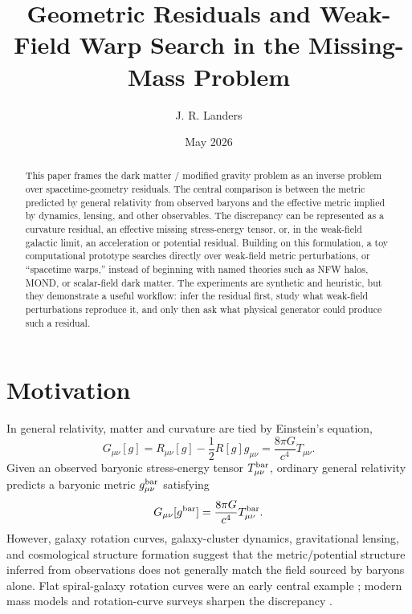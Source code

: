 \documentclass[10pt]{article}
\title{Geometric Residuals and Weak-Field Warp Search in the Missing-Mass Problem}
\author{J. R. Landers}
\date{\vspace{-0.65em}May 2026}
\newcommand{\cG}{\frac{8\pi G}{c^4}}
\newcommand{\Gbar}{G_{\mu\nu}[g^{\rm bar}]}
\begin{document}
\maketitle
\vspace{-1.9em}

\begin{abstract}
This paper frames the dark matter / modified gravity problem as an inverse problem over spacetime-geometry residuals. The central comparison is between the metric predicted by general relativity from observed baryons and the effective metric implied by dynamics, lensing, and other observables. The discrepancy can be represented as a curvature residual, an effective missing stress-energy tensor, or, in the weak-field galactic limit, an acceleration or potential residual. Building on this formulation, a toy computational prototype searches directly over weak-field metric perturbations, or ``spacetime warps,'' instead of beginning with named theories such as NFW halos, MOND, or scalar-field dark matter. The experiments are synthetic and heuristic, but they demonstrate a useful workflow: infer the residual first, study what weak-field perturbations reproduce it, and only then ask what physical generator could produce such a residual.
\end{abstract}

\section{Motivation}

In general relativity, matter and curvature are tied by Einstein's equation,
\begin{equation}
G_{\mu\nu}[g]
=
R_{\mu\nu}[g]-\frac{1}{2}R[g]g_{\mu\nu}
=
\cG T_{\mu\nu}.
\end{equation}
Given an observed baryonic stress-energy tensor $T^{\rm bar}_{\mu\nu}$, ordinary general relativity predicts a baryonic metric $g^{\rm bar}_{\mu\nu}$ satisfying
\begin{equation}
\Gbar=\cG T^{\rm bar}_{\mu\nu}.
\end{equation}
However, galaxy rotation curves, galaxy-cluster dynamics, gravitational lensing, and cosmological structure formation suggest that the metric/potential structure inferred from observations does not generally match the field sourced by baryons alone. Flat spiral-galaxy rotation curves were an early central example \citep{Rubin1980}; modern mass models and rotation-curve surveys sharpen the discrepancy \citep{Lelli2016,McGaugh2016}.
\end{document}
